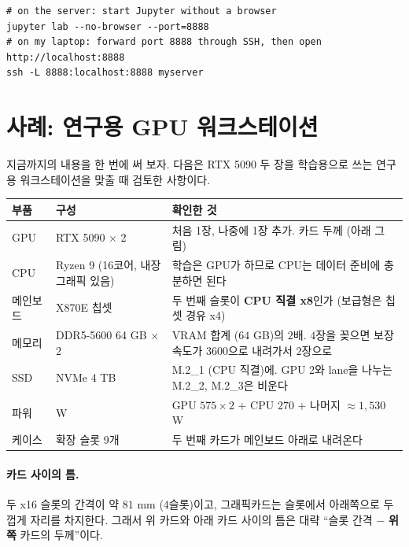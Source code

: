 \documentclass[11pt,a4paper]{article}
\begin{document}
\begin{lstlisting}[numbers=none]
# on the server: start Jupyter without a browser
jupyter lab --no-browser --port=8888
# on my laptop: forward port 8888 through SSH, then open http://localhost:8888
ssh -L 8888:localhost:8888 myserver
\end{lstlisting}

\section{사례: 연구용 GPU 워크스테이션}\label{sec:case}

지금까지의 내용을 한 번에 써 보자. 다음은 RTX 5090 두 장을 학습용으로 쓰는 연구용 워크스테이션을 맞출 때 검토한 사항이다.

\begin{center}
{\small
\begin{tabular}{@{}>{\raggedright\arraybackslash}p{24mm}>{\raggedright\arraybackslash}p{48mm}>{\raggedright\arraybackslash}p{78mm}@{}}
\toprule
부품 & 구성 & 확인한 것 \\
\midrule
GPU & RTX 5090 $\times$ 2 & 처음 1장, 나중에 1장 추가. 카드 두께 (아래 그림) \\
CPU & Ryzen 9 (16코어, 내장 그래픽 있음) & 학습은 GPU가 하므로 CPU는 데이터 준비에 충분하면 된다 \\
메인보드 & X870E 칩셋 & 두 번째 슬롯이 \textbf{CPU 직결 x8}인가 (보급형은 칩셋 경유 x4) \\
메모리 & DDR5-5600 64 GB $\times$ 2 & VRAM 합계 ($64$ GB)의 $2$배. $4$장을 꽂으면 보장 속도가 3600으로 내려가서 $2$장으로 \\
SSD & NVMe 4 TB & M.2\_1 (CPU 직결)에. GPU 2와 lane을 나누는 M.2\_2, M.2\_3은 비운다 \\
파워 & 2000 W & GPU $575\times2$ + CPU $270$ + 나머지 $\approx1{,}530$ W \\
케이스 & 확장 슬롯 9개 & 두 번째 카드가 메인보드 아래로 내려온다 \\
\bottomrule
\end{tabular}}
\end{center}

\paragraph{카드 사이의 틈.}
두 x16 슬롯의 간격이 약 $81$ mm ($4$슬롯)이고, 그래픽카드는 슬롯에서 아래쪽으로 두껍게 자리를 차지한다.
그래서 위 카드와 아래 카드 사이의 틈은 대략 ``슬롯 간격 $-$ \textbf{위쪽} 카드의 두께''이다.
\end{document}
